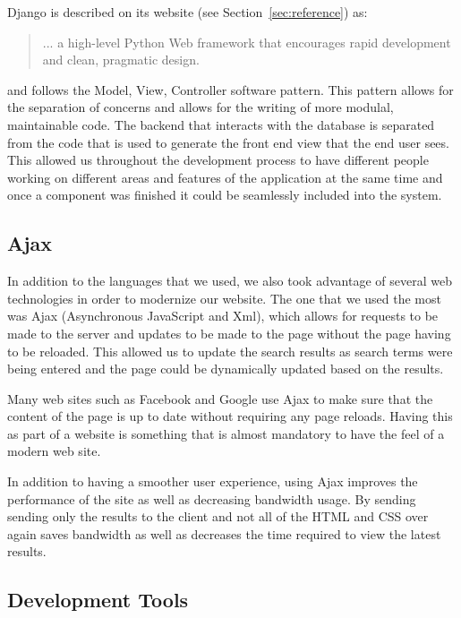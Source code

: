 \documentclass[11pt]{article}
\begin{document}
Django is described on its website (see Section~\vref{sec:reference})
as:

\begin{quotation}
  ... a high-level Python Web framework that encourages rapid
  development and clean, pragmatic design.
\end{quotation}

and follows the Model, View, Controller software pattern. This pattern
allows for the separation of concerns and allows for the writing of
more modulal, maintainable code. The backend that interacts with the
database is separated from the code that is used to generate the front
end view that the end user sees. This allowed us throughout the
development process to have different people working on different
areas and features of the application at the same time and once a
component was finished it could be seamlessly included into the
system.


\subsection{Ajax}
\label{sec:ajax}

In addition to the languages that we used, we also took advantage of
several web technologies in order to modernize our website. The one
that we used the most was Ajax (Asynchronous JavaScript and Xml),
which allows for requests to be made to the server and updates to be
made to the page without the page having to be reloaded. This allowed
us to update the search results as search terms were being entered and
the page could be dynamically updated based on the results.

Many web sites such as Facebook and Google use Ajax to make sure that
the content of the page is up to date without requiring any page
reloads. Having this as part of a website is something that is almost
mandatory to have the feel of a modern web site.

In addition to having a smoother user experience, using Ajax improves
the performance of the site as well as decreasing bandwidth usage. By
sending sending only the results to the client and not all of the HTML
and CSS over again saves bandwidth as well as decreases the time
required to view the latest results. 

\subsection{Development Tools}
\label{sec:development-tools}
\end{document}
